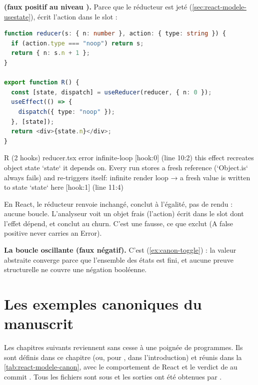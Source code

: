 \begin{piege}
\textbf{ (faux positif au niveau \Error).} Parce que le
réducteur est jeté (\cref{sec:react-modele-usestate}), 
écrit l'action dans le slot :
\begin{lstlisting}[language=TypeScript,caption={\code{R} : un réducteur qui ignore l'action \code{noop} (\file{/tmp/ch02/reducer.tsx}, imports omis)},label={lst:react-modele-reducer}]
function reducer(s: { n: number }, action: { type: string }) {
  if (action.type === "noop") return s;
  return { n: s.n + 1 };
}

export function R() {
  const [state, dispatch] = useReducer(reducer, { n: 0 });
  useEffect(() => {
    dispatch({ type: "noop" });
  }, [state]);
  return <div>{state.n}</div>;
}
\end{lstlisting}
\begin{sortie}
  R  (2 hooks)  reducer.tsx
    error  infinite-loop  [hook:0]  (line 10:2)  this effect recreates object state `state` it depends on. Every run stores a fresh reference (`Object.is` always fails) and re-triggers itself: infinite render loop
       → a fresh value is written to state `state` here [hook:1] (line 11:4)
\end{sortie}
En React, le réducteur renvoie  inchangé,  conclut à
l'égalité, pas de rendu : aucune boucle. L'analyseur voit un objet frais (l'action)
écrit dans le slot dont l'effet dépend, et conclut au churn. C'est une \Error{}
fausse, ce que  exclut (\og A false positive never
carries an Error\fg{}).
\end{piege}

\begin{piege}
\textbf{La boucle oscillante (faux négatif).} C'est 
(\cref{ex:canon-toggle}) : la valeur abstraite converge parce que
l'ensemble des états est fini, et aucune preuve structurelle ne couvre une
négation booléenne.
\end{piege}

\section{Les exemples canoniques du manuscrit}
\label{sec:react-modele-exemples}

Les chapitres suivants reviennent sans cesse à une poignée de programmes. Ils
sont définis dans ce chapitre (ou, pour , dans l'introduction) et
réunis dans la \cref{tab:react-modele-canon}, avec le comportement de React et
le verdict de \reactant{} au commit . Tous les fichiers sont sous
 et les sorties ont été obtenues par
.

